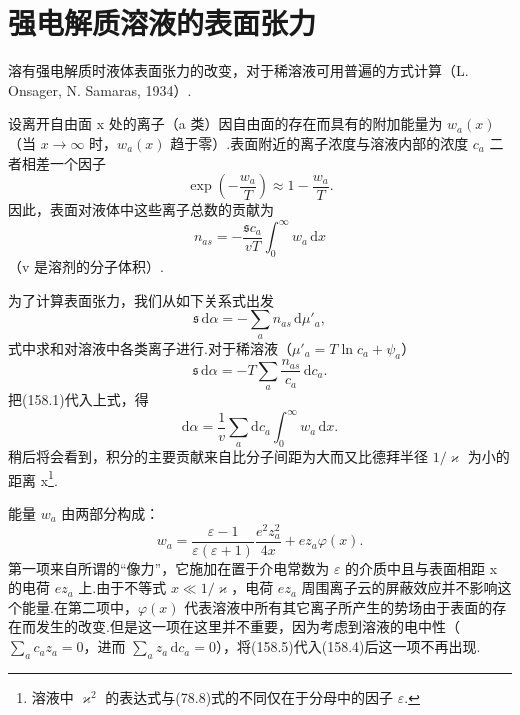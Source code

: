 \section{强电解质溶液的表面张力}

溶有强电解质时液体表面张力的改变，对于稀溶液可用普遍的方式计算（L. Onsager, N. Samaras, 1934）.

设离开自由面 x 处的离子（a 类）因自由面的存在而具有的附加能量为 $w_a(x)$（当 $x\to\infty$ 时，$w_a(x)$ 趋于零）.表面附近的离子浓度与溶液内部的浓度 $c_a$ 二者相差一个因子
\begin{equation*}
  \exp\left(-\frac{w_a}{T}\right)\approx1-\frac{w_a}{T}.
\end{equation*}
因此，表面对液体中这些离子总数的贡献为
\begin{equation}
  n_{as}=-\frac{\mathfrak{s}c_a}{vT}\int_0^{\infty}w_a\,\mathrm{d}x
\end{equation}
（v 是溶剂的分子体积）.

为了计算表面张力，我们从如下关系式出发
\begin{equation}
  \mathfrak{s}\,\mathrm{d}\alpha=-\sum_a n_{as}\,\mathrm{d}\mu'_a,
\end{equation}
式中求和对溶液中各类离子进行.对于稀溶液（$\mu'_a=T\ln c_a+\psi_a$）
\begin{equation}
  \mathfrak{s}\,\mathrm{d}\alpha=-T\sum_a\frac{n_{as}}{c_a}\,\mathrm{d}c_a.
\end{equation}
把(158.1)代入上式，得
\begin{equation}
  \mathrm{d}\alpha=\frac{1}{v}\sum_a\mathrm{d}c_a\int_0^{\infty}w_a\,\mathrm{d}x.
\end{equation}
稍后将会看到，积分的主要贡献来自比分子间距为大而又比德拜半径 $1/\varkappa$ 为小的距离 x\footnote{溶液中 $\varkappa^2$ 的表达式与(78.8)式的不同仅在于分母中的因子 $\varepsilon$.}.

能量 $w_a$ 由两部分构成：
\begin{equation}
  w_a=\frac{\varepsilon-1}{\varepsilon(\varepsilon+1)}
  \frac{e^2z_a^2}{4x}+ez_a\varphi(x).
\end{equation}
第一项来自所谓的“像力”，它施加在置于介电常数为 $\varepsilon$ 的介质中且与表面相距 x 的电荷 $ez_a$ 上.由于不等式 $x\ll1/\varkappa$，电荷 $ez_a$ 周围离子云的屏蔽效应并不影响这个能量.在第二项中，$\varphi(x)$ 代表溶液中所有其它离子所产生的势场由于表面的存在而发生的改变.但是这一项在这里并不重要，因为考虑到溶液的电中性（$\sum_a c_a z_a=0$，进而 $\sum_a z_a\,\mathrm{d}c_a=0$），将(158.5)代入(158.4)后这一项不再出现.

